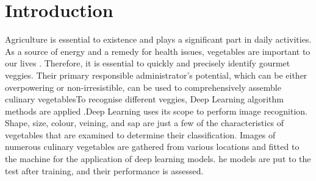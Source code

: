\documentclass[a4paper,fleqn]{cas-sc}
\begin{document}
\section{Introduction}
Agriculture is essential to existence and plays a significant part in daily activities. As a source of energy and a remedy for health issues, vegetables are important to our lives \cite{toor2021nutrients}.  Therefore, it is essential to quickly and precisely identify gourmet veggies. Their primary responsible administrator's potential, which can be either overpowering or non-irresistible, can be used to comprehensively assemble culinary vegetablesTo recognise different veggies, Deep Learning algorithm methods are applied \cite{tripathi2021detection}.Deep Learning \cite{kaur2022optimization} uses its scope to perform image recognition. Shape, size, colour, veining, and sap are just a few of the characteristics of vegetables that are examined to determine their classification. Images of numerous culinary vegetables are gathered from various locations and fitted to the machine for the application of deep learning models. he models are put to the test after training, and their performance is assessed.
        
\end{document}
